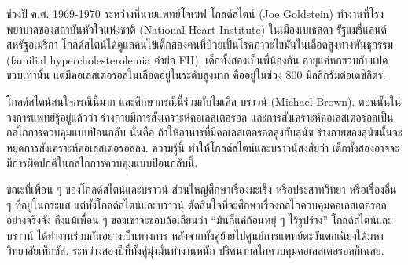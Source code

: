 {\begin{shaded}

\begin{Parallel}[c]{0.52\textwidth}{0.4\textwidth}
\end{Parallel}
\vspace{1cm}



ช่วงปี ค.ศ. 1969-1970 ระหว่างที่นายแพทย์โจเซฟ โกลด์สไตน์ (Joe Goldstein) ทำงานที่โรงพยาบาลของสถาบันหัวใจแห่งชาติ (National Heart Institute)
ในเมือง{เบเธสดา} รัฐแมรี่แลนด์ สหรัฐอเมริกา
โกลด์สไตน์ได้ดูแลคนไข้เด็กสองคนที่ป่วยเป็นโรคภาวะไขมันในเลือดสูงทางพันธุกรรม (familial hypercholesterolemia คำย่อ FH).
เด็กทั้งสองเป็นพี่น้องกัน อายุแค่หกขวบกับแปดขวบเท่านั้น 
แต่มีคอเลสเตอรอลในเลือดอยู่ในระดับสูงมาก คืออยู่ในช่วง $800$ มิลลิกรัมต่อเดซิลิตร.

โกลด์สไตน์สนใจกรณีนี้มาก และศึกษากรณีนี้ร่วมกับไมเคิล บราวน์ (Michael Brown).
ตอนนั้นในวงการแพทย์รู้อยู่แล้วว่า
ร่างกายมีการสังเคราะห์คอเลสเตอรอล
และการสังเคราะห์คอเลสเตอรอลเป็นกลไกการควบคุมแบบป้อนกลับ
นั่นคือ ถ้าให้อาหารที่มีคอเลสเตอรอลสูงกับสุนัข ร่างกายของสุนัขนั้นจะหยุดการสังเคราะห์คอเลสเตอรอลลง.
ความรู้นี้ ทำให้โกลด์สไตน์และบราวน์สงสัยว่า เด็กทั้งสองอาจจะมีการผิดปกติในกลไกการควบคุมแบบป้อนกลับนี้.

ขณะที่เพื่อน ๆ ของโกลด์สไตน์และบราวน์ ส่วนใหญ่ศึกษาเรื่องมะเร็ง หรือประสาทวิทยา หรือเรื่องอื่น ๆ ที่อยู่ในกระแส
แต่ทั้งโกลด์สไตน์และบราวน์ ตัดสินใจที่จะศึกษาเรื่องกลไกควบคุมคอเลสเตอรอลอย่างจริงจัง
ถึงแม้เพื่อน ๆ ของเขาจะชอบล้อเลียนว่า ``มันก็แค่ก้อนหยุ่ ๆ ไร้รูปร่าง''
โกลด์สไตน์และบราวน์ ได้ทำงานร่วมกันอย่างเป็นทางการ 
หลังจากทั้งคู่ย้ายไปศูนย์การแพทย์ตะวันตกเฉียงใต้มหาวิทยาลัยเท็กซัส.
ระหว่างสองปีที่ทั้งคู่มุ่งมั่นทำงานหนัก
ปริศนากลไกควบคุมคอเลสเตอรอลก็เฉลย.


\end{shaded}}

